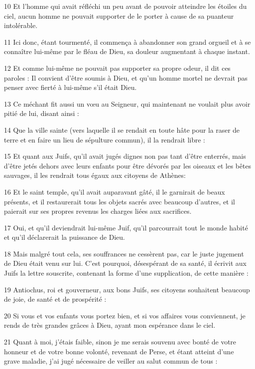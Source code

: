 \par 10 Et l'homme qui avait réfléchi un peu avant de pouvoir atteindre les étoiles du ciel, aucun homme ne pouvait supporter de le porter à cause de sa puanteur intolérable.
\par 11 Ici donc, étant tourmenté, il commença à abandonner son grand orgueil et à se connaître lui-même par le fléau de Dieu, sa douleur augmentant à chaque instant.
\par 12 Et comme lui-même ne pouvait pas supporter sa propre odeur, il dit ces paroles : Il convient d'être soumis à Dieu, et qu'un homme mortel ne devrait pas penser avec fierté à lui-même s'il était Dieu.
\par 13 Ce méchant fit aussi un vœu au Seigneur, qui maintenant ne voulait plus avoir pitié de lui, disant ainsi :
\par 14 Que la ville sainte (vers laquelle il se rendait en toute hâte pour la raser de terre et en faire un lieu de sépulture commun), il la rendrait libre :
\par 15 Et quant aux Juifs, qu'il avait jugés dignes non pas tant d'être enterrés, mais d'être jetés dehors avec leurs enfants pour être dévorés par les oiseaux et les bêtes sauvages, il les rendrait tous égaux aux citoyens de Athènes:
\par 16 Et le saint temple, qu'il avait auparavant gâté, il le garnirait de beaux présents, et il restaurerait tous les objets sacrés avec beaucoup d'autres, et il paierait sur ses propres revenus les charges liées aux sacrifices.
\par 17 Oui, et qu'il deviendrait lui-même Juif, qu'il parcourrait tout le monde habité et qu'il déclarerait la puissance de Dieu.
\par 18 Mais malgré tout cela, ses souffrances ne cessèrent pas, car le juste jugement de Dieu était venu sur lui. C'est pourquoi, désespérant de sa santé, il écrivit aux Juifs la lettre souscrite, contenant la forme d'une supplication, de cette manière :
\par 19 Antiochus, roi et gouverneur, aux bons Juifs, ses citoyens souhaitent beaucoup de joie, de santé et de prospérité :
\par 20 Si vous et vos enfants vous portez bien, et si vos affaires vous conviennent, je rends de très grandes grâces à Dieu, ayant mon espérance dans le ciel.
\par 21 Quant à moi, j'étais faible, sinon je me serais souvenu avec bonté de votre honneur et de votre bonne volonté, revenant de Perse, et étant atteint d'une grave maladie, j'ai jugé nécessaire de veiller au salut commun de tous :
